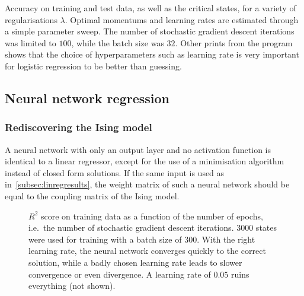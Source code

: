 \documentclass[11pt,british,a4paper]{article}
\numberwithin{equation}{section}
\begin{document}
\begin{table}[H]
    \centering
    \caption{Accuracy on training and test data, as well as the critical states, for a variety of regularisations \(\lambda\). Optimal momentums and learning rates are estimated through a simple parameter sweep. The number of stochastic gradient descent iterations was limited to \(100\), while the batch size was \(32\). Other prints from the program shows that the choice of hyperparameters such as learning rate is very important for logistic regression to be better than guessing.}
\end{table}

\subsection{Neural network regression}
\subsubsection{Rediscovering the Ising model}
A neural network with only an output layer and no activation function is identical to a linear regressor, except for the use of a minimisation algorithm instead of closed form solutions.
If the same input is used as in~\vref{subsec:linregresults}, the weight matrix of such a neural network should be equal to the coupling matrix of the Ising model.

\begin{figure}[H]
    \centering
    \caption{\(R^2\) score on training data as a function of the number of epochs, i.e.\ the number of stochastic gradient descent iterations. \(\num{3000}\) states were used for training with a batch size of \(300\). With the right learning rate, the neural network converges quickly to the correct solution, while a badly chosen learning rate leads to slower convergence or even divergence. A learning rate of \(\num{0.05}\) ruins everything (not shown).}\label{fig:r2nn}
\end{figure}
\end{document}
